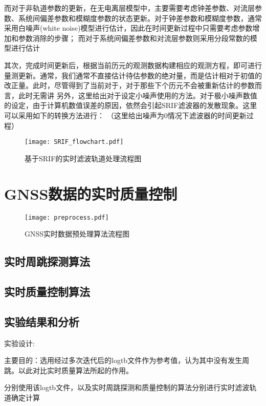 而对于非轨道参数的更新，在无电离层模型中，主要需要考虑钟差参数、对流层参数、系统间偏差参数和模糊度参数的状态更新。对于钟差参数和模糊度参数，通常采用白噪声(white noise)模型进行估计，因此在时间更新过程中只需要考虑参数增加和参数消除的步骤；
而对于系统间偏差参数和对流层参数则采用分段常数的模型进行估计

其次，完成时间更新后，根据当前历元的观测数据构建相应的观测方程，即可进行量测更新。通常，我们通常不直接估计待估参数的绝对量，而是估计相对于初值的改正量。此时，尽管得到了当前对于，对于那些下个历元不会被重新估计的参数而言，此时无需讲
另外，这里给出对于设定小噪声使用的方法。对于极小噪声数值的设定，由于计算机数值误差的原因，依然会引起SRIF滤波器的发散现象。这里可以采用如下的转换方法进行：
（这里给出噪声为0情况下滤波器的时间更新过程）


\begin{figure}
  \centering
  \texttt{[image: SRIF\_flowchart.pdf]}
  \caption{基于SRIF的实时滤波轨道处理流程图}
  \label{fig:SRIF_flowchart}
\end{figure}

\section{GNSS数据的实时质量控制}

\begin{figure}
  \centering
  \texttt{[image: preprocess.pdf]}
  \caption{GNSS实时数据预处理算法流程图}
  \label{fig:tb_flowchart}
\end{figure}

\subsection{实时周跳探测算法}

\subsection{实时质量控制算法}


\subsection{实验结果和分析}

实验设计:

主要目的：选用经过多次迭代后的log\underline{\space}tb文件作为参考值，认为其中没有发生周跳。以此对比实时质量算法所起的作用。

分别使用该log\underline{\space}tb文件，以及实时周跳探测和质量控制的算法分别进行实时滤波轨道确定计算


